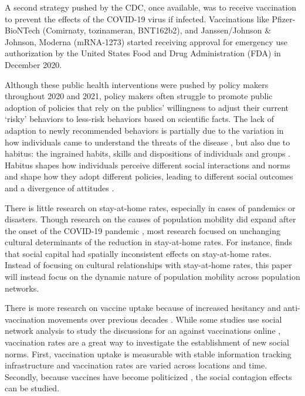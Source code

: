 A second strategy pushed by the CDC, once available, was to receive vaccination
to prevent the effects of the COVID-19 virus if infected. Vaccinations like
Pfizer-BioNTech (Comirnaty, tozinameran, BNT162b2), and Janssen/Johnson \&
Johnson, Moderna (mRNA-1273) started receiving approval for emergency use
authorization by the United States Food and Drug Administration (FDA) in
December 2020.

Although these public health interventions were pushed by policy makers
throughout 2020 and 2021, policy makers often struggle to promote public
adoption of policies that rely on the publics' willingness to adjust their
current `risky' behaviors to less-risk behaviors based on scientific facts. The
lack of adaption to newly recommended behaviors is partially due to the
variation in how individuals came to understand the threats of the disease
\citep{akpanAssociationWhatPeople2021, bailey_etal20}, but also due to habitus: the
ingrained habits, skills and dispositions of individuals and groups
\citep{bourdieu77}. Habitus shapes how individuals perceive different social
interactions and norms and shape how they adopt different policies, leading to
different social outcomes and a divergence of attitudes \citep{scottarthur_etal21, williams95, madeira_etal18}.

There is little research on stay-at-home rates, especially in cases of pandemics
or disasters. Though research on the causes of population mobility did expand
after the onset of the COVID-19 pandemic 
\citep{bargainTrustCompliancePublic2020, bourassaStatelevelStayathomeOrders2020, bourassaSocialDistancingHealth2020, grossmanPoliticalPartisanshipInfluences2020, haggerPredictingSocialDistancing2020, hillBloodChristCompels2020, hillNastiestQuestion, hillLoveThyAged2021,huynhDoesCultureMatter2020}, most research focused on unchanging cultural
determinants of the reduction in stay-at-home rates. For instance, \citet{gibbons_etal21}
 finds that social capital had spatially inconsistent effects on
stay-at-home rates. Instead of focusing on cultural relationships with
stay-at-home rates, this paper will instead focus on the dynamic nature of
population mobility across population networks.

There is more research on vaccine uptake \citep{schmidBarriersInfluenzaVaccination2017}
 because of increased hesitancy and
anti-vaccination movements over previous decades \citep{baumgaertnerInfluencePoliticalIdeology2018, hornseyDonaldTrumpVaccination2020, johnsonOnlineCompetitionPro2020, whiteheadHowCultureWars2020}. While some studies use social network analysis to
study the discussions for an against vaccinations online \citep{milaniVisualVaccineDebate2020}, vaccination rates are a great way to
investigate the establishment of new social norms. First, vaccination uptake is
measurable with stable information tracking infrastructure and vaccination
rates are varied across locations and time. Secondly, because vaccines have 
become politicized \citep{mottaRepublicansNotDemocrats2021, mottaIdentifyingPrevalenceCorrelates2021}, the social contagion effects can be
studied.

